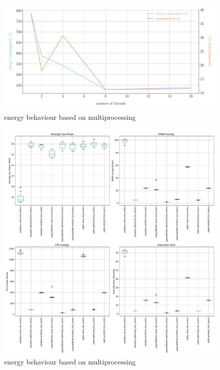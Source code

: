 \begin{figure}
    \centering
    \includegraphics[width=\linewidth]{imgs/multiprocessing_energyvstime}
    \caption{energy behaviour based on multiprocessing}
    \label{fig:python_multiprocessing}
\end{figure}






\begin{figure}
    \centering
    \includegraphics[width=\linewidth]{imgs/django}
    \caption{energy behaviour based on multiprocessing}
    \label{fig:python_multiprocessing}
\end{figure}

